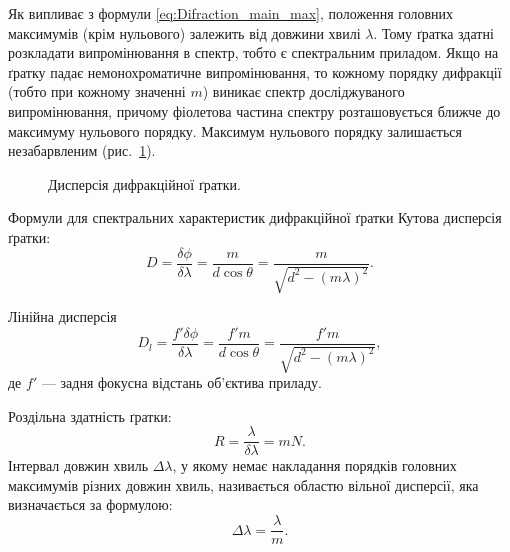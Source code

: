 Як випливає з формули \eqref{eq:Difraction_main_max}, положення головних максимумів (крім нульового) залежить від довжини хвилі $\lambda$. Тому ґратка здатні розкладати випромінювання в спектр, тобто є спектральним приладом. Якщо на ґратку падає немонохроматичне випромінювання, то кожному порядку дифракції (тобто при кожному значенні $m$) виникає спектр досліджуваного випромінювання, причому фіолетова частина спектру розташовується ближче до максимуму нульового порядку. Максимум нульового порядку залишається незабарвленим (рис.~\ref{pic:slotd_dispersion}).



\begin{figure}[h!]\centering
    
    \caption{Дисперсія дифракційної ґратки.}
    \label{pic:slotd_dispersion}
\end{figure}

\begin{Theory}{Формули для спектральних характеристик дифракційної ґратки}
    Кутова дисперсія ґратки:
    \begin{equation}\label{eq:Difraction_angular_dispersion}
        D = \frac{\delta\phi}{\delta\lambda} = \frac{m}{d\cos\theta} = \frac{m}{\sqrt{d^2 - (m\lambda)^2}}.
    \end{equation}

    Лінійна дисперсія
    \begin{equation}\label{eq:Difraction_linear_dispersion}
        D_l = \frac{f'\delta\phi}{\delta\lambda} = \frac{f'm}{d\cos\theta} = \frac{f'm}{\sqrt{d^2 - (m\lambda)^2}},
    \end{equation}
    де $f'$ --- задня фокусна відстань об'єктива приладу.

    Роздільна здатність ґратки:
    \begin{equation}\label{eq:Difraction_Slots_resolution}
        R = \frac{\lambda}{\delta\lambda} = mN.
    \end{equation}
    Інтервал довжин хвиль $\Delta\lambda$, у якому немає накладання порядків головних максимумів різних довжин хвиль, називається областю вільної дисперсії, яка визначається за формулою:
    \begin{equation}\label{eq:Difraction_free_dispersion}
        \Delta\lambda = \frac{\lambda}{m}.
    \end{equation}
\end{Theory}




